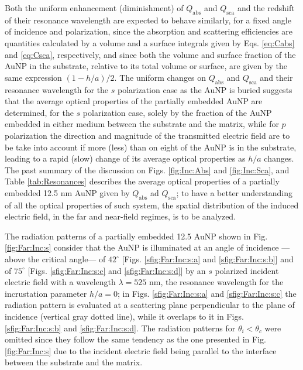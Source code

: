 Both the uniform enhancement (diminishment) of $Q_\text{abs}$ and $Q_\text{sca}$  and the  redshift of their resonance wavelength  are expected to behave similarly, for a fixed angle of incidence and polarization, since the absorption and scattering efficiencies are quantities calculated by a volume and a surface integrals given by  Eqs. \eqref{eq:Cabs} and \eqref{eq:Csca}, respectively,  and since both the volume and surface fraction of the AuNP in the substrate, relative to its total volume or surface, are given by the same expression $(1-h/a)/2$. The uniform changes on $Q_\text{abs}$ and $Q_\text{sca}$ and their resonance wavelength for the $s$ polarization case as the AuNP is buried suggests that the average optical properties of the partially embedded AuNP are determined, for the $s$ polarization case, solely by the fraction of the AuNP embedded in either medium between the substrate and the matrix, while for $p$ polarization the direction and magnitude of the transmitted electric field are to be take into account if more (less) than on eight of the AuNP is in the substrate, leading to a rapid (slow) change of its average optical properties as $h/a$ changes. The past summary of the discussion on Figs. \ref{fig:Inc:Abs} and \ref{fig:Inc:Sca}, and Table \ref{tab:Resonances} describes the average optical properties of a partially embedded 12.5 nm AuNP given by $Q_\text{abs}$ ad $Q_\text{sca}$; to have a better understanding of all the optical properties of such system, the spatial distribution of the induced electric field, in the far and near-field regimes, is to be analyzed.

The radiation patterns of a partially embedded 12.5 AuNP shown in Fig. \ref{fig:Far:Inc:s} consider that the AuNP is illuminated at an angle of incidence ---above the critical angle--- of $42^\circ$ [Figs. \ref{sfig:Far:Inc:s:a} and \ref{sfig:Far:Inc:s:b}] and of $75^\circ$ [Figs. \ref{sfig:Far:Inc:s:c} and \ref{sfig:Far:Inc:s:d}] by an $s$ polarized incident electric field with a wavelength $\lambda = 525$ nm, the resonance wavelength for the incrustation parameter $h/a = 0$; in Figs. \ref{sfig:Far:Inc:s:a} and   \ref{sfig:Far:Inc:s:c} the radiation pattern is evaluated at a scattering plane perpendicular to the plane of incidence (vertical gray dotted line), while it overlaps to it in  Figs. \ref{sfig:Far:Inc:s:b} and   \ref{sfig:Far:Inc:s:d}. The radiation patterns for $\theta_i<\theta_c$ were omitted since they follow the same tendency as the one presented in Fig. \ref{fig:Far:Inc:s} due to the incident electric field being parallel to the interface between the substrate and the matrix.

